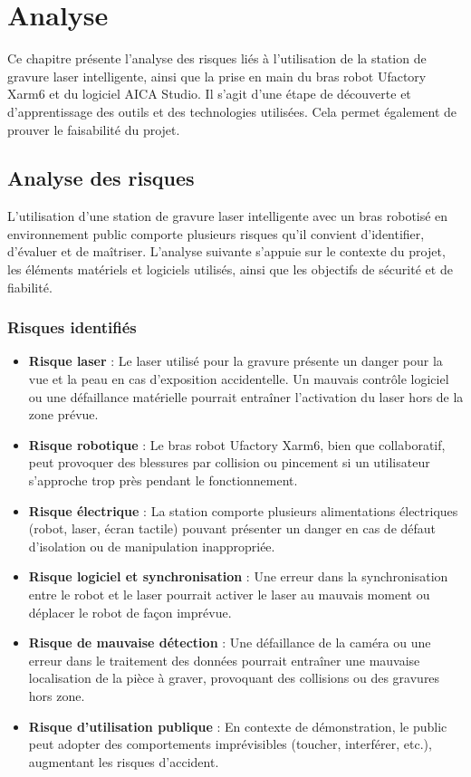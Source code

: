\chapter{Analyse}
\label{chap:analyse}

Ce chapitre présente l'analyse des risques liés à l'utilisation de la station de gravure laser intelligente, ainsi que la prise en main du bras robot Ufactory Xarm6 et du logiciel AICA Studio. Il s'agit d'une étape de découverte et d'apprentissage des outils et des technologies utilisées. Cela permet également de prouver le faisabilité du projet.

\section{Analyse des risques}
L'utilisation d'une station de gravure laser intelligente avec un bras robotisé en environnement public comporte plusieurs risques qu'il convient d'identifier, d'évaluer et de maîtriser. L'analyse suivante s'appuie sur le contexte du projet, les éléments matériels et logiciels utilisés, ainsi que les objectifs de sécurité et de fiabilité.

\subsection{Risques identifiés}
\begin{itemize}
    \item \textbf{Risque laser} : Le laser utilisé pour la gravure présente un danger pour la vue et la peau en cas d'exposition accidentelle. Un mauvais contrôle logiciel ou une défaillance matérielle pourrait entraîner l'activation du laser hors de la zone prévue.
    \item \textbf{Risque robotique} : Le bras robot Ufactory Xarm6, bien que collaboratif, peut provoquer des blessures par collision ou pincement si un utilisateur s'approche trop près pendant le fonctionnement.
    \item \textbf{Risque électrique} : La station comporte plusieurs alimentations électriques (robot, laser, écran tactile) pouvant présenter un danger en cas de défaut d'isolation ou de manipulation inappropriée.
    \item \textbf{Risque logiciel et synchronisation} : Une erreur dans la synchronisation entre le robot et le laser pourrait activer le laser au mauvais moment ou déplacer le robot de façon imprévue.
    \item \textbf{Risque de mauvaise détection} : Une défaillance de la caméra ou une erreur dans le traitement des données pourrait entraîner une mauvaise localisation de la pièce à graver, provoquant des collisions ou des gravures hors zone.
    \item \textbf{Risque d'utilisation publique} : En contexte de démonstration, le public peut adopter des comportements imprévisibles (toucher, interférer, etc.), augmentant les risques d'accident.
\end{itemize}

